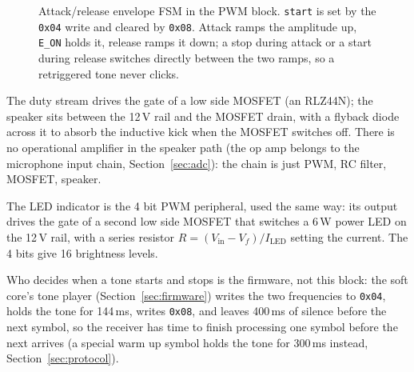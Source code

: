 \documentclass[a4paper,11pt]{article}
\begin{document}
\begin{figure}[H]
\centering
{}
\caption{Attack/release envelope FSM in the PWM block. \texttt{start} is set by the
\texttt{0x04} write and cleared by \texttt{0x08}. Attack ramps the amplitude up,
\texttt{E\_ON} holds it, release ramps it down; a stop during attack or a start
during release switches directly between the two ramps, so a retriggered tone never
clicks.}
\label{fig:pwm-env}
\end{figure}

The duty stream drives the gate of a low side MOSFET (an RLZ44N); the speaker sits
between the 12\,V rail and the MOSFET drain, with a flyback diode across it to absorb
the inductive kick when the MOSFET switches off. There is no operational amplifier in
the speaker path (the op amp belongs to the microphone input chain,
Section~\ref{sec:adc}): the chain is just PWM, RC filter, MOSFET, speaker.

The LED indicator is the 4 bit PWM peripheral, used the same way: its output drives
the gate of a second low side MOSFET that switches a 6\,W power LED on the 12\,V
rail, with a series resistor $R = (V_\mathrm{in}-V_f)/I_\mathrm{LED}$ setting the
current. The 4 bits give 16 brightness levels.

Who decides when a tone starts and stops is the firmware, not this block: the
soft core's tone player (Section~\ref{sec:firmware}) writes the two frequencies to
\texttt{0x04}, holds the tone for 144\,ms, writes \texttt{0x08}, and leaves
400\,ms of silence before the next symbol, so the receiver has time to finish
processing one symbol before the next arrives (a special warm up symbol holds the
tone for 300\,ms instead, Section~\ref{sec:protocol}).
\end{document}
